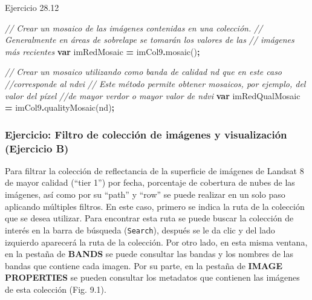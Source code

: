 \documentclass[
  12pt,
  letterpaper,
  twoside]{book}
\newenvironment{Shaded}{\begin{snugshade}}{\end{snugshade}}
\newcommand{\CommentTok}[1]{\textcolor[rgb]{0.56,0.35,0.01}{\textit{#1}}}
\newcommand{\FunctionTok}[1]{\textcolor[rgb]{0.00,0.00,0.00}{#1}}
\newcommand{\KeywordTok}[1]{\textcolor[rgb]{0.13,0.29,0.53}{\textbf{#1}}}
\newcommand{\NormalTok}[1]{#1}
\newcommand{\OperatorTok}[1]{\textcolor[rgb]{0.81,0.36,0.00}{\textbf{#1}}}
\newcommand{\StringTok}[1]{\textcolor[rgb]{0.31,0.60,0.02}{#1}}
\begin{document}
Ejercicio 28.12

\begin{Shaded}
\begin{Highlighting}[]
\CommentTok{// Crear un mosaico de las imágenes contenidas en una colección. }
\CommentTok{// Generalmente en áreas de sobrelape se tomarán los valores de las }
\CommentTok{// imágenes más recientes}
\KeywordTok{var}\NormalTok{ imRedMosaic }\OperatorTok{=}\NormalTok{ imCol9}\OperatorTok{.}\FunctionTok{mosaic}\NormalTok{()}\OperatorTok{;}

\CommentTok{// Crear un mosaico utilizando como banda de calidad \textquotesingle{}nd\textquotesingle{} que en este caso}
\CommentTok{//corresponde al ndvi}
\CommentTok{// Este método permite obtener mosaicos, por ejemplo, del valor del píxel}
\CommentTok{//de mayor verdor o mayor valor de ndvi}
\KeywordTok{var}\NormalTok{ imRedQualMosaic }\OperatorTok{=}\NormalTok{ imCol9}\OperatorTok{.}\FunctionTok{qualityMosaic}\NormalTok{(}\StringTok{\textquotesingle{}nd\textquotesingle{}}\NormalTok{)}\OperatorTok{;}
\end{Highlighting}
\end{Shaded}

\hypertarget{ejercicio-filtro-de-colecciuxf3n-de-imuxe1genes-y-visualizaciuxf3n-ejercicio-b}{%
\subsubsection{Ejercicio: Filtro de colección de imágenes y visualización (Ejercicio B)}\label{ejercicio-filtro-de-colecciuxf3n-de-imuxe1genes-y-visualizaciuxf3n-ejercicio-b}}

Para filtrar la colección de reflectancia de la superficie de imágenes de Landsat 8 de mayor calidad (``tier 1'') por fecha, porcentaje de cobertura de nubes de las imágenes, así como por su ``path'' y ``row'' se puede realizar en un solo paso aplicando múltiples filtros. En este caso, primero se indica la ruta de la colección que se desea utilizar. Para encontrar esta ruta se puede buscar la colección de interés en la barra de búsqueda (\texttt{Search}), después se le da clic y del lado izquierdo aparecerá la ruta de la colección. Por otro lado, en esta misma ventana, en la pestaña de \textbf{BANDS} se puede consultar las bandas y los nombres de las bandas que contiene cada imagen. Por su parte, en la pestaña de \textbf{IMAGE PROPERTIES} se pueden consultar los metadatos que contienen las imágenes de esta colección (Fig. 9.1).
\end{document}
